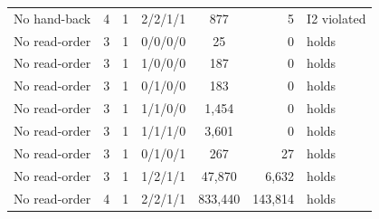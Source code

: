 \begin{tabular}{@{}lccccrl@{}}
No hand-back & 4 & 1 & 2/2/1/1 & 877 & 5 & I2 violated \\
No read-order & 3 & 1 & 0/0/0/0 & 25 & 0 & holds \\
No read-order & 3 & 1 & 1/0/0/0 & 187 & 0 & holds \\
No read-order & 3 & 1 & 0/1/0/0 & 183 & 0 & holds \\
No read-order & 3 & 1 & 1/1/0/0 & 1,454 & 0 & holds \\
No read-order & 3 & 1 & 1/1/1/0 & 3,601 & 0 & holds \\
No read-order & 3 & 1 & 0/1/0/1 & 267 & 27 & holds \\
No read-order & 3 & 1 & 1/2/1/1 & 47,870 & 6,632 & holds \\
No read-order & 4 & 1 & 2/2/1/1 & 833,440 & 143,814 & holds \\
\bottomrule
\end{tabular}
